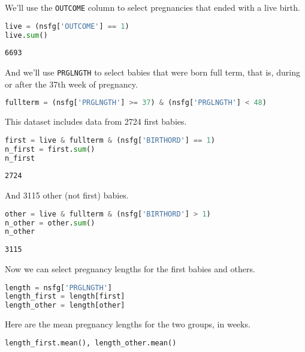We'll use the \passthrough{\lstinline!OUTCOME!} column to select
pregnancies that ended with a live birth.

\begin{lstlisting}[language=Python,style=source]
live = (nsfg['OUTCOME'] == 1)
live.sum()
\end{lstlisting}

\begin{lstlisting}[style=output]
6693
\end{lstlisting}

And we'll use \passthrough{\lstinline!PRGLNGTH!} to select babies that
were born full term, that is, during or after the 37th week of
pregnancy.

\begin{lstlisting}[language=Python,style=source]
fullterm = (nsfg['PRGLNGTH'] >= 37) & (nsfg['PRGLNGTH'] < 48)
\end{lstlisting}

This dataset includes data from 2724 first babies.

\begin{lstlisting}[language=Python,style=source]
first = live & fullterm & (nsfg['BIRTHORD'] == 1)
n_first = first.sum()
n_first
\end{lstlisting}

\begin{lstlisting}[style=output]
2724
\end{lstlisting}

And 3115 other (not first) babies.

\begin{lstlisting}[language=Python,style=source]
other = live & fullterm & (nsfg['BIRTHORD'] > 1)
n_other = other.sum()
n_other
\end{lstlisting}

\begin{lstlisting}[style=output]
3115
\end{lstlisting}

Now we can select pregnancy lengths for the first babies and others.

\begin{lstlisting}[language=Python,style=source]
length = nsfg['PRGLNGTH']
length_first = length[first]
length_other = length[other]
\end{lstlisting}

Here are the mean pregnancy lengths for the two groups, in weeks.

\begin{lstlisting}[language=Python,style=source]
length_first.mean(), length_other.mean()
\end{lstlisting}

